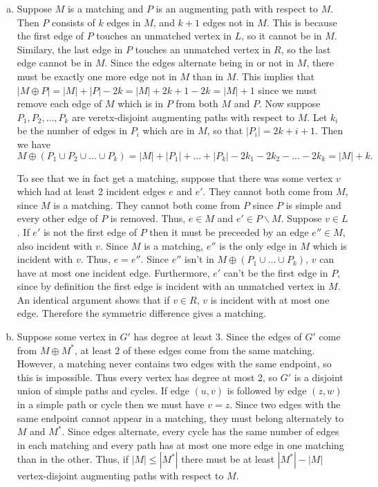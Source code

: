 \documentclass{article}
\begin{document}
\begin{enumerate}[a.]
\item Suppose $M$ is a matching and $P$ is an augmenting path with respect to $M$.  Then $P$ consists of $k$ edges in $M$, and $k+1$ edges not in $M$.  This is because the first edge of $P$ touches an unmatched vertex in $L$, so it cannot be in $M$.  Similary, the last edge in $P$ touches an unmatched vertex in $R$, so the last edge cannot be in $M$.  Since the edges alternate being in or not in $M$, there must be exactly one more edge not in $M$ than in $M$.   This implies that $|M \oplus P| = |M| + |P| - 2k = |M| + 2k + 1 - 2k = |M| + 1$ since we must remove each edge of $M$ which is in $P$ from both $M$ and $P$.  Now suppose $P_1, P_2, \ldots, P_k$ are veretx-disjoint augmenting paths with respect to $M$.  Let $k_i$ be the number of edges in $P_i$ which are in $M$, so that $|P_i| = 2k+i + 1$.  Then we have 
\[ M \oplus (P_1 \cup P_2 \cup \ldots \cup P_k) = |M| + |P_1| + \ldots + |P_k| - 2k_1 - 2k_2 - \ldots - 2k_k = |M| + k.\]

To see that we in fact get a matching, suppose that there was some vertex $v$ which had at least 2 incident edges $e$ and $e'$.  They cannot both come from $M$, since $M$ is a matching. They cannot both come from $P$ since $P$ is simple and every other edge of $P$ is removed.  Thus, $e \in M$ and $e' \in P\backslash M$. Suppose $v \in L$.  If $e'$ is not the first edge of $P$ then it must be preceeded by an edge $e'' \in M$, also incident with $v$.  Since $M$ is a matching, $e''$ is the only edge in $M$ which is incident with $v$.  Thus, $e = e''$.  Since $e''$ isn't in $M \oplus (P_1 \cup \ldots \cup P_k)$, $v$ can have at most one incident edge.  Furthermore, $e'$ can't be the first edge in $P$, since by definition the first edge is incident with an unmatched vertex in $M$.  An identical argument shows that if $v \in R$, $v$ is incident with at most one edge.  Therefore the symmetric difference gives a matching.


\item Suppose some vertex in $G'$ has degree at least 3.  Since the edges of $G'$ come from $M \oplus M^*$, at least 2 of these edges come from the same matching.  However, a matching never contains two edges with the same endpoint, so this is impossible.  Thus every vertex has degree at most 2, so $G'$ is a disjoint union of simple paths and cycles. If edge $(u,v)$ is followed by edge $(z,w)$ in a simple path or cycle then we must have $v = z$.  Since two edges with the same endpoint cannot appear in a matching, they must belong alternately to $M$ and $M^*$.  Since edges alternate, every cycle has the same number of edges in each matching and every path has at most one more edge in one matching than in the other.  Thus, if $|M| \leq |M^*|$ there must be at least $|M^*| - |M|$ vertex-disjoint augmenting paths with respect to $M$. 


\end{enumerate}
\end{document}
